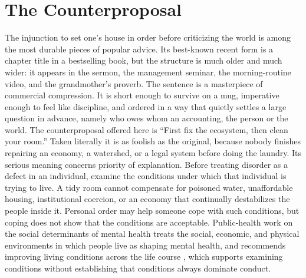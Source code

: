 \documentclass[12pt]{article}
\begin{document}
\section{The Counterproposal}\label{sec:counter}

The injunction to set one's house in order before criticizing the world is among the most durable pieces of popular advice. Its best-known recent form is a chapter title in a bestselling book, but the structure is much older and much wider: it appears in the sermon, the management seminar, the morning-routine video, and the grandmother's proverb. The sentence is a masterpiece of commercial compression. It is short enough to survive on a mug, imperative enough to feel like discipline, and ordered in a way that quietly settles a large question in advance, namely who owes whom an accounting, the person or the world. The counterproposal offered here is ``First fix the ecosystem, then clean your room.'' Taken literally it is as foolish as the original, because nobody finishes repairing an economy, a watershed, or a legal system before doing the laundry. Its serious meaning concerns priority of explanation. Before treating disorder as a defect in an individual, examine the conditions under which that individual is trying to live. A tidy room cannot compensate for poisoned water, unaffordable housing, institutional coercion, or an economy that continually destabilizes the people inside it. Personal order may help someone cope with such conditions, but coping does not show that the conditions are acceptable. Public-health work on the social determinants of mental health treats the social, economic, and physical environments in which people live as shaping mental health, and recommends improving living conditions across the life course \cite{who2014}, which supports examining conditions without establishing that conditions always dominate conduct.
\end{document}
